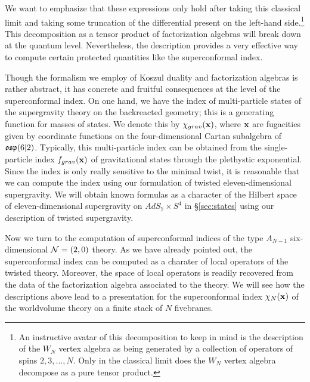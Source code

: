 We want to emphasize that these expressions only hold after taking this classical limit and taking some truncation of the differential present on the left-hand side.\footnote{An instructive avatar of this decomposition to keep in mind is the description of the $W_N$ vertex algebra as being generated by a collection of operators of spins $2,3,\ldots, N$.
Only in the classical limit does the $W_N$ vertex algebra decompose as a pure tensor product.}
This decomposition as a tensor product of factorization algebras will break down at the quantum level.
Nevertheless, the description provides a very effective way to compute certain protected quantities like the superconformal index.

Though the formalism we employ of Koszul duality and factorization algebras is rather abstract, it has concrete and fruitful consequences at the level of the superconformal index.
On one hand, we have the index of multi-particle states of the supergravity theory on the backreacted geometry; this is a generating function for masses of states. We denote this by $\chi_{grav}({\bf x})$, where ${\bf x}$ are fugacities given by coordinate functions on the four-dimensional Cartan subalgebra of~$\mathfrak{osp}(6|2)$.
Typically, this multi-particle index can be obtained from the single-particle index $f_{grav}({\bf x})$ of gravitational states through the plethystic exponential. 
Since the index is only really sensitive to the minimal twist, it is reasonable that we can compute the index using our formulation of twisted eleven-dimensional supergravity.
We will obtain known formulas as a character of the Hilbert space of eleven-dimensional supergravity on $AdS_7\times S^{4}$ in \S\ref{sec:states} using our description of twisted supergravity.

Now we turn to the computation of superconformal indices of the type $A_{N-1}$ six-dimensional $\mathcal N=(2,0)$ theory. As we have already pointed out, the superconformal index can be computed as a charater of local operators of the twisted theory. Moreover, the space of local operators is readily recovered from the data of the factorization algebra associated to the theory. We will see how the descriptions above lead to a presentation for the superconformal index $\chi_N({\bf x})$ of the worldvolume theory on a finite stack of $N$ fivebranes.

